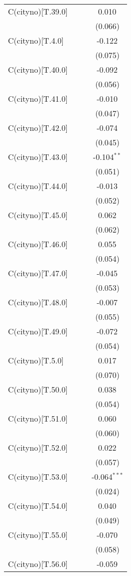 \begin{table}[!htbp]
\begin{tabular}{@{\extracolsep{5pt}}lccc}
 C(cityno)[T.39.0] & & & 0.010$^{}$ \\
& & & (0.066) \\
 C(cityno)[T.4.0] & & & -0.122$^{}$ \\
& & & (0.075) \\
 C(cityno)[T.40.0] & & & -0.092$^{}$ \\
& & & (0.056) \\
 C(cityno)[T.41.0] & & & -0.010$^{}$ \\
& & & (0.047) \\
 C(cityno)[T.42.0] & & & -0.074$^{}$ \\
& & & (0.045) \\
 C(cityno)[T.43.0] & & & -0.104$^{**}$ \\
& & & (0.051) \\
 C(cityno)[T.44.0] & & & -0.013$^{}$ \\
& & & (0.052) \\
 C(cityno)[T.45.0] & & & 0.062$^{}$ \\
& & & (0.062) \\
 C(cityno)[T.46.0] & & & 0.055$^{}$ \\
& & & (0.054) \\
 C(cityno)[T.47.0] & & & -0.045$^{}$ \\
& & & (0.053) \\
 C(cityno)[T.48.0] & & & -0.007$^{}$ \\
& & & (0.055) \\
 C(cityno)[T.49.0] & & & -0.072$^{}$ \\
& & & (0.054) \\
 C(cityno)[T.5.0] & & & 0.017$^{}$ \\
& & & (0.070) \\
 C(cityno)[T.50.0] & & & 0.038$^{}$ \\
& & & (0.054) \\
 C(cityno)[T.51.0] & & & 0.060$^{}$ \\
& & & (0.060) \\
 C(cityno)[T.52.0] & & & 0.022$^{}$ \\
& & & (0.057) \\
 C(cityno)[T.53.0] & & & -0.064$^{***}$ \\
& & & (0.024) \\
 C(cityno)[T.54.0] & & & 0.040$^{}$ \\
& & & (0.049) \\
 C(cityno)[T.55.0] & & & -0.070$^{}$ \\
& & & (0.058) \\
 C(cityno)[T.56.0] & & & -0.059$^{}$ \\

\end{tabular}
\end{table}
